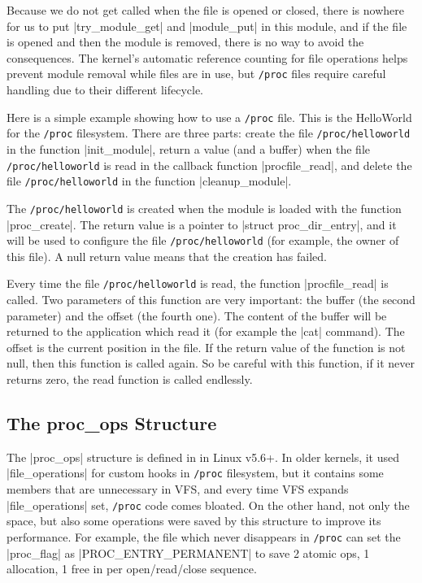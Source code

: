 \documentclass[10pt, oneside]{book}
\begin{document}
Because we do not get called when the file is opened or closed, there is nowhere for us to put \cpp|try_module_get| and \cpp|module_put| in this module, and if the file is opened and then the module is removed, there is no way to avoid the consequences.
The kernel's automatic reference counting for file operations helps prevent module removal while files are in use,
but \verb|/proc| files require careful handling due to their different lifecycle.

Here is a simple example showing how to use a \verb|/proc| file.
This is the HelloWorld for the \verb|/proc| filesystem.
There are three parts: create the file \verb|/proc/helloworld| in the function \cpp|init_module|, return a value (and a buffer) when the file \verb|/proc/helloworld| is read in the callback function \cpp|procfile_read|, and delete the file \verb|/proc/helloworld| in the function \cpp|cleanup_module|.

The \verb|/proc/helloworld| is created when the module is loaded with the function \cpp|proc_create|.
The return value is a pointer to \cpp|struct proc_dir_entry|, and it will be used to configure the file \verb|/proc/helloworld| (for example, the owner of this file).
A null return value means that the creation has failed.

Every time the file \verb|/proc/helloworld| is read, the function \cpp|procfile_read| is called.
Two parameters of this function are very important: the buffer (the second parameter) and the offset (the fourth one).
The content of the buffer will be returned to the application which read it (for example the \sh|cat| command).
The offset is the current position in the file.
If the return value of the function is not null, then this function is called again.
So be careful with this function, if it never returns zero, the read function is called endlessly.



\subsection{The proc\_ops Structure}
\label{sec:proc_ops}
The \cpp|proc_ops| structure is defined in  in Linux v5.6+.
In older kernels, it used \cpp|file_operations| for custom hooks in \verb|/proc| filesystem, but it contains some members that are unnecessary in VFS, and every time VFS expands \cpp|file_operations| set, \verb|/proc| code comes bloated.
On the other hand, not only the space, but also some operations were saved by this structure to improve its performance.
For example, the file which never disappears in \verb|/proc| can set the \cpp|proc_flag| as \cpp|PROC_ENTRY_PERMANENT| to save 2 atomic ops, 1 allocation, 1 free in per open/read/close sequence.
\end{document}
